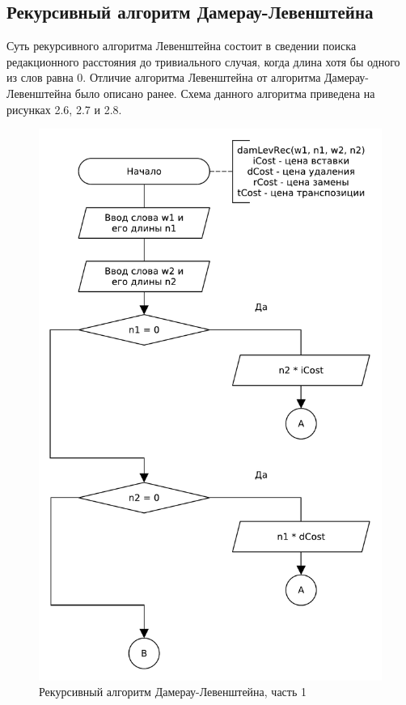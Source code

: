 \subsection{Рекурсивный алгоритм Дамерау-Левенштейна}
Суть рекурсивного алгоритма Левенштейна состоит в сведении поиска редакционного расстояния до тривиального случая, когда длина хотя бы одного из слов равна 0. Отличие алгоритма Левенштейна от алгоритма Дамерау-Левенштейна было описано ранее. Схема данного алгоритма приведена на рисунках 2.6, 2.7 и 2.8.
\begin{figure}[H]
    \centering
    \includegraphics[scale=0.75]{pdf/damerau-levenshteainrec-part1.pdf}
    \caption{Рекурсивный алгоритм Дамерау-Левенштейна, часть 1}
\end{figure}
